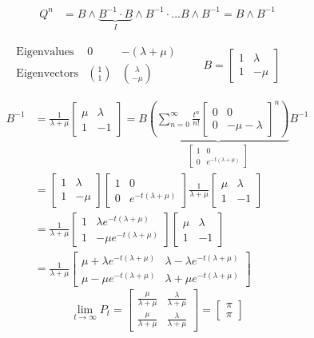 \documentclass[12pt]{article}
\begin{document}
\begin{align}
    Q^n & = B \wedge \underbrace{B^{-1}\cdot B}_I \wedge B^{-1}\cdot \ldots B \wedge B^{-1} = B \wedge B^{-1}\nonumber
\end{align}

$$\begin{matrix}
\text{Eigenvalues}&0&-(\lambda+\mu)\\
\text{Eigenvectors}&\binom{1}{1}&\binom{\lambda}{-\mu}
\end{matrix}\qquad
B=\begin{bmatrix}
1&\lambda \\1&-\mu
\end{bmatrix}\qquad$$

\begin{align}
B^{-1}&=\frac{1}{\lambda+\mu}\begin{bmatrix}
\mu&\lambda\\1&-1 
\end{bmatrix}
=B\underbrace{\left(\sum\limits_{n=0}^\infty \frac{t^n}{n!} 
\begin{bmatrix}
0&0\\0&-\mu-\lambda
\end{bmatrix}^n
\right)}_{\begin{bmatrix}
1&0\\0&e^{-t(\lambda+\mu)}
\end{bmatrix}}B^{-1} \nonumber \\
&=\begin{bmatrix}1&\lambda \\ 1 &-\mu \end{bmatrix}
\begin{bmatrix}1&0\\0&e^{-t(\lambda+\mu)}\end{bmatrix}
\frac{1}{\lambda+\mu}\begin{bmatrix}\mu&\lambda\\1&-1\end{bmatrix} \nonumber \\
&=\frac{1}{\lambda+\mu} \begin{bmatrix}1&\lambda e^{-t(\lambda+\mu)} \\ 1 &-\mu e^{-t(\lambda+\mu)} \end{bmatrix}
\begin{bmatrix}\mu&\lambda\\1&-1\end{bmatrix} \nonumber \\
&=\frac{1}{\lambda+\mu}\begin{bmatrix}
\mu+\lambda e^{-t(\lambda+\mu)}&\lambda - \lambda e^{-t(\lambda+\mu)} \nonumber \\
\mu-\mu e^{-t(\lambda+\mu)} & \lambda + \mu e^{-t(\lambda+\mu)}
\end{bmatrix} \nonumber \nonumber
\end{align}
$$
\lim\limits_{t\to\infty} P_t = 
\begin{bmatrix}
\frac{\mu}{\lambda+\mu}&\frac{\lambda}{\lambda+\mu} \\
\frac{\mu}{\lambda+\mu}&\frac{\lambda}{\lambda+\mu}\end{bmatrix}
=\begin{bmatrix}\pi\\ \pi\end{bmatrix}
$$
\end{document}
